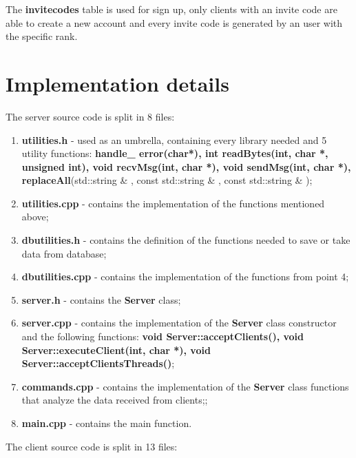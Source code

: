 \documentclass[runningheads]{llncs}
\begin{document}
\par The \textbf{invitecodes} table is used for sign up, only clients with an invite code are able to create a new account and every invite code is generated by an user with the specific rank.

\newpage
\section{Implementation details}
\par The server source code is split in 8 files:
\begin{enumerate}
\item \textbf{utilities.h} - used as an umbrella, containing every library needed and 5 utility functions: \textbf{handle\_ error(char*), int readBytes(int, char *, unsigned int), void recvMsg(int, char *), void sendMsg(int, char *), replaceAll}(std::string \& , const std::string \& , const std::string \& );
\item \textbf{utilities.cpp} - contains the implementation of the functions mentioned above;
\item \textbf{dbutilities.h} - contains the definition of the functions needed to save or take data from database;
\item \textbf{dbutilities.cpp} - contains the implementation of the functions from point 4;
\item \textbf{server.h} - contains the \textbf{Server} class;
\item \textbf{server.cpp} - contains the implementation of the \textbf{Server} class constructor and the following functions: \textbf{ void Server::acceptClients(), void Server::executeClient(int, char *), void Server::acceptClientsThreads()};
\item \textbf{commands.cpp} - contains the implementation of the \textbf{Server} class functions that analyze the data received from clients;;
\item \textbf{main.cpp} - contains the main function.
\end{enumerate}

\par The client source code is split in 13 files:
\end{document}
